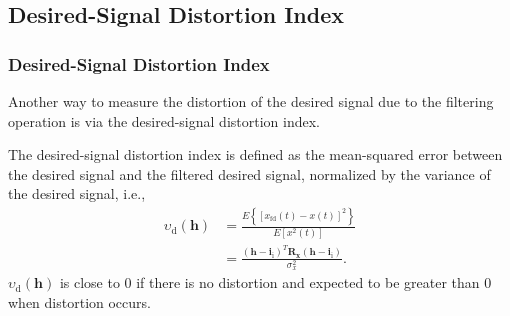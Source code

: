 \documentclass[10pt,pdflatex,headrule,landscape]{beamer}
\begin{document}
\subsection{Desired-Signal Distortion Index}
\begin{frame}
 \frametitle{Desired-Signal Distortion Index}

Another way to measure the distortion of the desired signal due to the filtering operation is via the desired-signal distortion
index.

The desired-signal distortion
index is defined as the mean-squared error between the desired signal and the filtered desired signal, normalized by the variance of the desired signal, i.e.,
\begin{align}
\label{C2-SDI}
 \upsilon_{\mathrm{d}}\left(\mathbf{h} \right) &=
 \frac{ E \left\{ \left[ x_{\mathrm{fd}}(t) - x(t) \right]^2 \right\} } { E \left[ x^2(t) \right] } \\
 &= \frac{ \left( \mathbf{h} - \mathbf{i}_{\mathrm{i}} \right)^T \mathbf{R}_{\mathbf{x}}
 \left( \mathbf{h} - \mathbf{i}_{\mathrm{i}} \right) } { \sigma_x^2 } . \nonumber
\end{align}
$\upsilon_{\mathrm{d}}\left(\mathbf{h} \right)$ is close to 0 if there is no distortion and expected to be greater than 0 when distortion occurs.

\end{frame}
\end{document}
